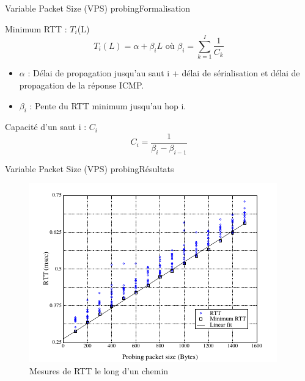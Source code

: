 \documentclass[compress]{beamer}
\begin{document}
\begin{frame}{Variable Packet Size (VPS) probing}{Formalisation}
	\begin{block}{Minimum RTT : $T_i$(L)}
	$$T_{i}(L) = \alpha + \beta_{i}L \text{ où } \beta_i = \sum^{I}_{k=1} \frac{1}{C_k}$$
	\end{block}
\begin{itemize}
	\item $\alpha$ : Délai de propagation jusqu'au saut i + délai de 	sérialisation et délai de propagation de la réponse ICMP.
	\item $\beta_i$ : Pente du RTT minimum jusqu'au hop i. %
\end{itemize}

\begin{block}{Capacité d'un saut i : $C_i$}
	$$ C_i = \frac{1}{\beta_i - \beta_{i-1}} $$
\end{block}
\end{frame}


\begin{frame}{Variable Packet Size (VPS) probing}{Résultats}
	\begin{figure}[hbtp]
		\centering
		\includegraphics[scale=0.7]{schema4.png}
		\caption{Mesures de RTT le long d'un chemin}
	\end{figure}
\end{frame}
\end{document}
